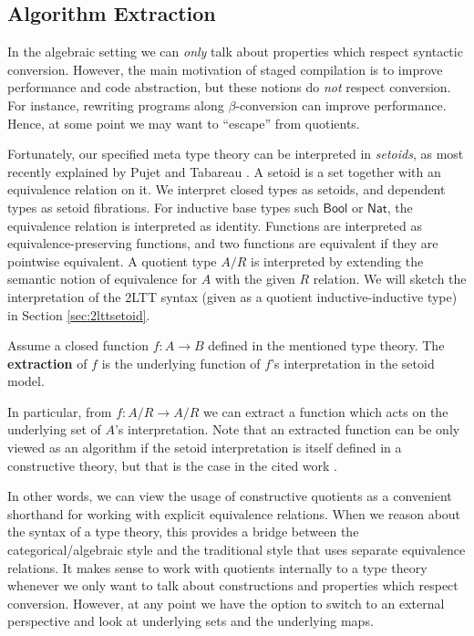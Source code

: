 \documentclass[acmsmall,review]{acmart}
\newcommand{\msf}[1]{\mathsf{#1}}
\newcommand{\Bool}{\msf{Bool}}
\newcommand{\Nat}{\msf{Nat}}
\theoremstyle{remark}
\begin{document}
\subsection{Algorithm Extraction}

In the algebraic setting we can \emph{only} talk about properties which
respect syntactic conversion. However, the main motivation of staged compilation is to
improve performance and code abstraction, but these notions do \emph{not}
respect conversion. For instance, rewriting programs along $\beta$-conversion
can improve performance. Hence, at some point we may want to ``escape'' from
quotients.

Fortunately, our specified meta type theory can be interpreted in
\emph{setoids}, as most recently explained by Pujet and Tabareau
\cite{DBLP:journals/pacmpl/PujetT22}. A setoid is a set together with an
equivalence relation on it. We interpret closed types as setoids, and
dependent types as setoid fibrations. For inductive base types such $\Bool$ or
$\Nat$, the equivalence relation is interpreted as identity. Functions are
interpreted as equivalence-preserving functions, and two functions are equivalent if
they are pointwise equivalent. A quotient type $A/R$ is interpreted by extending
the semantic notion of equivalence for $A$ with the given $R$ relation. We will
sketch the interpretation of the 2LTT syntax (given as a quotient inductive-inductive type)
in Section \ref{sec:2lttsetoid}.

\begin{definition} Assume a closed function $f : A \to B$ defined
in the mentioned type theory. The \textbf{extraction} of $f$ is
the underlying function of $f$'s interpretation in the setoid model.
\end{definition}

In particular, from $f : A/R \to A/R$ we can extract a function which acts on
the underlying set of $A$'s interpretation. Note that an extracted function can
be only viewed as an algorithm if the setoid interpretation is itself defined in
a constructive theory, but that is the case in the cited work
\cite{DBLP:journals/pacmpl/PujetT22}.

In other words, we can view the usage of constructive quotients as a convenient
shorthand for working with explicit equivalence relations. When we reason about
the syntax of a type theory, this provides a bridge between the
categorical/algebraic style and the traditional style that uses separate
equivalence relations. It makes sense to work with quotients internally to a
type theory whenever we only want to talk about constructions and properties
which respect conversion. However, at any point we have the option to switch to
an external perspective and look at underlying sets and the underlying maps.
\end{document}

